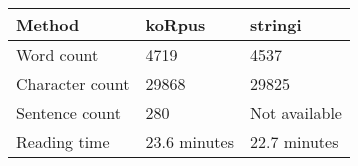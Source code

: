 \documentclass[,article,,moreauthors,pdftex]{mdpi}
\begin{document}
\begin{longtable}[]{@{}lll@{}}
\toprule
Method & koRpus & stringi\tabularnewline
\midrule
\endhead
Word count & 4719 & 4537\tabularnewline
Character count & 29868 & 29825\tabularnewline
Sentence count & 280 & Not available\tabularnewline
Reading time & 23.6 minutes & 22.7 minutes\tabularnewline
\bottomrule
\end{longtable}

%

\vspace{6pt}








\end{document}
